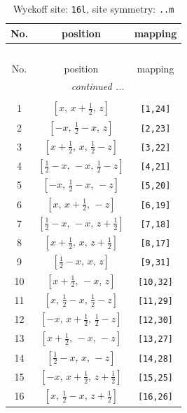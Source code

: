 \documentclass[fleqn,8pt]{jsarticle}
\begin{document}
\renewcommand{\arraystretch}{1.2}
\begin{longtable}{ccc}
\caption{Wyckoff site: {\tt 16l}, site symmetry: {\tt ..m}}
 \\
 \hline \hline
No. & position & mapping \\ \hline \endfirsthead

\multicolumn{2}{l}{\tablename\ \thetable{}} \\
 \hline \hline
No. & position & mapping \\ \hline \endhead

 \hline \hline
\multicolumn{2}{r}{\footnotesize\it continued ...} \\ \endfoot

 \hline \hline
\multicolumn{2}{r}{} \\ \endlastfoot

1 & $\left[ x,\, x + \frac{1}{2},\, z \right]$ & {\tt [1,24]} \\ \hline
2 & $\left[ - x,\, \frac{1}{2} - x,\, z \right]$ & {\tt [2,23]} \\ \hline
3 & $\left[ x + \frac{1}{2},\, x,\, \frac{1}{2} - z \right]$ & {\tt [3,22]} \\ \hline
4 & $\left[ \frac{1}{2} - x,\, - x,\, \frac{1}{2} - z \right]$ & {\tt [4,21]} \\ \hline
5 & $\left[ - x,\, \frac{1}{2} - x,\, - z \right]$ & {\tt [5,20]} \\ \hline
6 & $\left[ x,\, x + \frac{1}{2},\, - z \right]$ & {\tt [6,19]} \\ \hline
7 & $\left[ \frac{1}{2} - x,\, - x,\, z + \frac{1}{2} \right]$ & {\tt [7,18]} \\ \hline
8 & $\left[ x + \frac{1}{2},\, x,\, z + \frac{1}{2} \right]$ & {\tt [8,17]} \\ \hline
9 & $\left[ \frac{1}{2} - x,\, x,\, z \right]$ & {\tt [9,31]} \\ \hline
10 & $\left[ x + \frac{1}{2},\, - x,\, z \right]$ & {\tt [10,32]} \\ \hline
11 & $\left[ x,\, \frac{1}{2} - x,\, \frac{1}{2} - z \right]$ & {\tt [11,29]} \\ \hline
12 & $\left[ - x,\, x + \frac{1}{2},\, \frac{1}{2} - z \right]$ & {\tt [12,30]} \\ \hline
13 & $\left[ x + \frac{1}{2},\, - x,\, - z \right]$ & {\tt [13,27]} \\ \hline
14 & $\left[ \frac{1}{2} - x,\, x,\, - z \right]$ & {\tt [14,28]} \\ \hline
15 & $\left[ - x,\, x + \frac{1}{2},\, z + \frac{1}{2} \right]$ & {\tt [15,25]} \\ \hline
16 & $\left[ x,\, \frac{1}{2} - x,\, z + \frac{1}{2} \right]$ & {\tt [16,26]} \\
\end{longtable}
\end{document}
